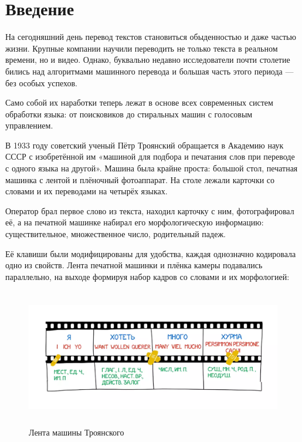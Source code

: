 


	
	
	
	\section{Введение}
	
	На сегодняшний день перевод текстов становиться обыденностью и даже частью жизни. Крупные компании научили переводить не только текста в реальном времени, но и видео. Однако, буквально недавно исследователи почти столетие бились над алгоритмами машинного перевода и большая часть этого периода — без особых успехов.
    
    Само собой их наработки теперь лежат в основе всех современных систем обработки языка: от поисковиков до стиральных машин с голосовым управлением.
    
    В 1933 году советский ученый Пётр Троянский обращается в Академию наук СССР с изобретённой им «машиной для подбора и печатания слов при переводе с одного языка на другой». Машина была крайне проста: большой стол, печатная машинка с лентой и плёночный фотоаппарат. На столе лежали карточки со словами и их переводами на четырёх языках.
    
    Оператор брал первое слово из текста, находил карточку с ним, фотографировал её, а на печатной машинке набирал его морфологическую информацию: существительное, множественное число, родительный падеж.

    Её клавиши были модифицированы для удобства, каждая однозначно кодировала одно из свойств. Лента печатной машинки и плёнка камеры подавались параллельно, на выходе формируя набор кадров со словами и их морфологией:
    
    \begin{figure}[ht!]
		\centering
		\captionsetup{justification=centering}
		\includegraphics[height=60mm]{img/Машина_Троянского.png}
		\caption{Лента машины Троянского}
	\end{figure}
	
